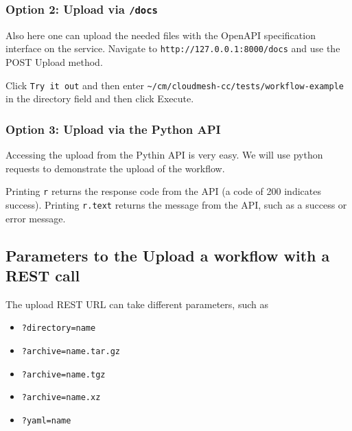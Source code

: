\subsubsection{\texorpdfstring{Option 2: Upload via
\texttt{/docs}}{Option 2: Upload via /docs}}\label{option-2-upload-via-docs-1}

Also here one can upload the needed files with the OpenAPI specification
interface on the service. Navigate to
\texttt{http://127.0.0.1:8000/docs} and use the POST Upload method.

Click \texttt{Try\ it\ out} and then enter
\texttt{\textasciitilde{}/cm/cloudmesh-cc/tests/workflow-example} in the
directory field and then click Execute.

\subsubsection{Option 3: Upload via the Python
API}\label{option-3-upload-via-the-python-api-1}

Accessing the upload from the Pythin API is very easy. We will use
python requests to demonstrate the upload of the workflow.

\begin{Shaded}
\begin{Highlighting}[]

\OperatorTok{=}\NormalTok{)}
\end{Highlighting}
\end{Shaded}

Printing \texttt{r} returns the response code from the API (a code of
200 indicates success). Printing \texttt{r.text} returns the message
from the API, such as a success or error message.

\subsection{Parameters to the Upload a workflow with a REST
call}\label{parameters-to-the-upload-a-workflow-with-a-rest-call}

The upload REST URL can take different parameters, such as

\begin{itemize}
\tightlist
\item
  \texttt{?directory=name}
\item
  \texttt{?archive=name.tar.gz}
\item
  \texttt{?archive=name.tgz}
\item
  \texttt{?archive=name.xz}
\item
  \texttt{?yaml=name}
\end{itemize}

